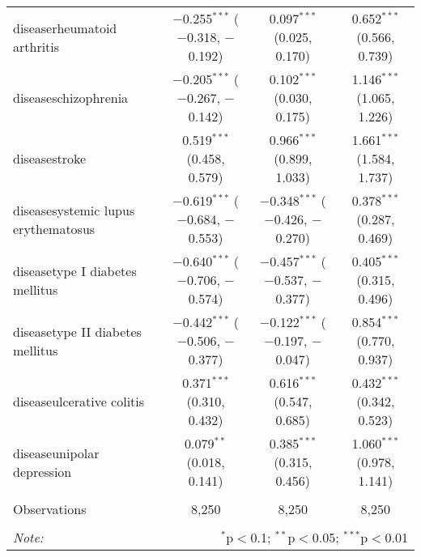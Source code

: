 \begin{table}[!htbp]
\begin{tabular}{@{\extracolsep{5pt}}lccc}
  diseaserheumatoid arthritis & $-$0.255$^{***}$ ($-$0.318, $-$0.192) & 0.097$^{***}$ (0.025, 0.170) & 0.652$^{***}$ (0.566, 0.739) \\ 
  diseaseschizophrenia & $-$0.205$^{***}$ ($-$0.267, $-$0.142) & 0.102$^{***}$ (0.030, 0.175) & 1.146$^{***}$ (1.065, 1.226) \\ 
  diseasestroke & 0.519$^{***}$ (0.458, 0.579) & 0.966$^{***}$ (0.899, 1.033) & 1.661$^{***}$ (1.584, 1.737) \\ 
  diseasesystemic lupus erythematosus & $-$0.619$^{***}$ ($-$0.684, $-$0.553) & $-$0.348$^{***}$ ($-$0.426, $-$0.270) & 0.378$^{***}$ (0.287, 0.469) \\ 
  diseasetype I diabetes mellitus & $-$0.640$^{***}$ ($-$0.706, $-$0.574) & $-$0.457$^{***}$ ($-$0.537, $-$0.377) & 0.405$^{***}$ (0.315, 0.496) \\ 
  diseasetype II diabetes mellitus & $-$0.442$^{***}$ ($-$0.506, $-$0.377) & $-$0.122$^{***}$ ($-$0.197, $-$0.047) & 0.854$^{***}$ (0.770, 0.937) \\ 
  diseaseulcerative colitis & 0.371$^{***}$ (0.310, 0.432) & 0.616$^{***}$ (0.547, 0.685) & 0.432$^{***}$ (0.342, 0.523) \\ 
  diseaseunipolar depression & 0.079$^{**}$ (0.018, 0.141) & 0.385$^{***}$ (0.315, 0.456) & 1.060$^{***}$ (0.978, 1.141) \\ 
 \hline \\[-1.8ex] 
Observations & 8,250 & 8,250 & 8,250 \\ 
\hline 
\hline \\[-1.8ex] 
\textit{Note:}  & \multicolumn{3}{r}{$^{*}$p$<$0.1; $^{**}$p$<$0.05; $^{***}$p$<$0.01} \\ 
\end{tabular} 
\end{table} 
